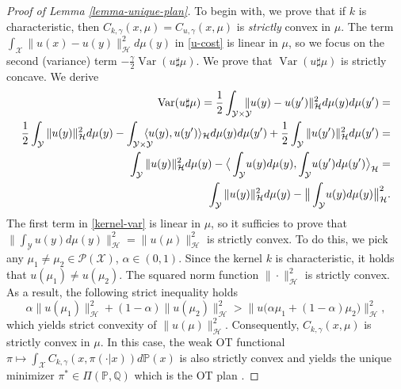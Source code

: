 \documentclass{article} %
\DeclareMathOperator{\Var}{Var}
\begin{document}
\begin{proof}[Proof of Lemma \ref{lemma-unique-plan}]To begin with, we prove that if $k$ is characteristic, then $C_{k,\gamma}(x,\mu)=C_{u,\gamma}(x,\mu)$ is \textit{strictly} convex in $\mu$. The term $\int_{\mathcal{X}}\|u(x)-u(y)\|^{2}_{\mathcal{H}}d\mu(y)$ in \eqref{u-cost} is linear in $\mu$, so we focus on the second (variance) term $-\frac{\gamma}{2}\Var(u\sharp\mu)$. We prove that $\Var(u\sharp\mu)$ is strictly concave. We derive
\begin{eqnarray}
    \Var(u\sharp\mu)=\frac{1}{2}\int_{\mathcal{Y}\times\mathcal{Y}}\hspace{-3mm}\|u(y)-u(y')\|_{\mathcal{H}}^{2}d\mu(y)d\mu(y')=
    \nonumber
    \\
    \frac{1}{2}\int_{\mathcal{Y}}\|u(y)\|^{2}_{\mathcal{H}}d\mu(y)-\int_{\mathcal{Y}\times\mathcal{Y}}\hspace{-3mm}\langle u(y),u(y')\rangle_{\mathcal{H}} d\mu(y)d\mu(y')+\frac{1}{2}\int_{\mathcal{Y}}\|u(y')\|^{2}_{\mathcal{H}}d\mu(y')=
    \nonumber
    \\
    \int_{\mathcal{Y}}\|u(y)\|^{2}_{\mathcal{H}}d\mu(y)-\big\langle\int_{\mathcal{Y}} \!u(y)d\mu(y),\int_{\mathcal{Y}}\!u(y')d\mu(y')\big\rangle_{\mathcal{H}}=
    \nonumber
    \\
    \int_{\mathcal{Y}}\|u(y)\|^{2}_{\mathcal{H}}d\mu(y)-\big\|\int_{\mathcal{Y}} \!u(y)d\mu(y)\big\|^{2}_{\mathcal{H}}.
    \label{kernel-var}
\end{eqnarray}
The first term in \eqref{kernel-var} is linear in $\mu$, so it sufficies to prove that $\big\|\int_{\mathcal{Y}} \!u(y)d\mu(y)\big\|^{2}_{\mathcal{H}}=\|u(\mu)\|_{\mathcal{H}}^{2}$ is strictly convex.
To do this, we pick any $\mu_{1}\neq\mu_{2}\in\mathcal{P}(\mathcal{X})$, $\alpha\in(0,1)$. Since the kernel $k$ is characteristic, it holds that $u(\mu_{1})\neq u(\mu_{2})$. The squared norm function $\|\cdot\|_{\mathcal{H}}^{2}$ is strictly convex. As a result, the following  strict inequality holds 
$$\alpha\|u(\mu_{1})\|^{2}_{\mathcal{H}}+(1-\alpha)\|u(\mu_{2})\|^{2}_{\mathcal{H}}>\|u\big(\alpha\mu_{1}+(1-\alpha)\mu_{2}\big)\|^{2}_{\mathcal{H}},$$
which yields strict convexity of $\|u(\mu)\|^{2}_{\mathcal{H}}.$ Consequently, $C_{k,\gamma}(x,\mu)$ is strictly convex in $\mu$. In this case, the weak OT functional $\pi\mapsto \int_{\mathcal{X}}C_{k,\gamma}(x,\pi(\cdot|x))d\mathbb{P}(x)$ is also strictly convex and yields the unique minimizer $\pi^{*}\in\Pi(\mathbb{P},\mathbb{Q})$ which is the OT plan \citep[.1]{backhoff2019existence}.

\end{proof}
\end{document}

